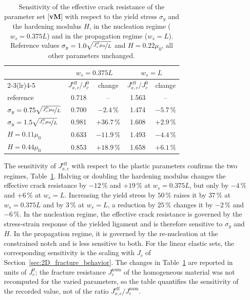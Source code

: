 \documentclass[pdflatex,sn-mathphys-num]{sn-jnl}%
\newcommand{\vMLabel}{[\textbf{vM}]\xspace}
\theoremstyle{thmstyleone}%
\theoremstyle{thmstyletwo}%
\theoremstyle{thmstylethree}%
\begin{document}
\begin{table}[htb]
\centering
\caption{Sensitivity of the effective crack resistance of the parameter set \vMLabel with respect to the yield stress $\sigma_y$ and the hardening modulus $H$, in the nucleation regime ($w_s = 0.375L$) and in the propagation regime ($w_s = L$). Reference values $\sigma_y = 1.0\sqrt{\nicefrac{J_c^0\mu_0}{L}}$ and $H = 0.22\mu_0$, all other parameters unchanged.}
\label{tab:sensitivity_2D}
\begin{tabular}{lcccc}
\toprule
 & \multicolumn{2}{c}{$w_s = 0.375L$} & \multicolumn{2}{c}{$w_s = L$} \\
\cmidrule(lr){2-3}\cmidrule(lr){4-5}
 & $J_{x,c}^{\text{eff}}/J_c^0$ & change & $J_{x,c}^{\text{eff}}/J_c^0$ & change \\
\midrule
reference                                        & 0.718 & --        & 1.563 & --       \\
$\sigma_y = 0.75\sqrt{\nicefrac{J_c^0\mu_0}{L}}$ & 0.700 & $-2.4\,\%$  & 1.474 & $-5.7\,\%$ \\
$\sigma_y = 1.5\sqrt{\nicefrac{J_c^0\mu_0}{L}}$  & 0.981 & $+36.7\,\%$ & 1.608 & $+2.9\,\%$ \\
$H = 0.11\mu_0$                                  & 0.633 & $-11.9\,\%$ & 1.493 & $-4.4\,\%$ \\
$H = 0.44\mu_0$                                  & 0.853 & $+18.9\,\%$ & 1.658 & $+6.1\,\%$ \\
\bottomrule
\end{tabular}
\end{table}

The sensitivity of $J_{x,c}^{\text{eff}}$ with respect to the plastic parameters confirms the two regimes, Table~\ref{tab:sensitivity_2D}. Halving or doubling the hardening modulus changes the effective crack resistance by $-12\,\%$ and $+19\,\%$ at $w_s = 0.375L$, but only by $-4\,\%$ and $+6\,\%$ at $w_s = L$. Increasing the yield stress by $50\,\%$ raises it by $37\,\%$ at $w_s = 0.375L$ and by $3\,\%$ at $w_s = L$, a reduction by $25\,\%$ changes it by $-2\,\%$ and $-6\,\%$. In the nucleation regime, the effective crack resistance is governed by the stress-strain response of the yielded ligament and is therefore sensitive to $\sigma_y$ and $H$. In the propagation regime, it is governed by the re-nucleation at the constrained notch and is less sensitive to both. For the linear elastic sets, the corresponding sensitivity is the scaling with $J_c$ of Section~\ref{sec:2D_fracture_behavior}. The changes in Table~\ref{tab:sensitivity_2D} are reported in units of $J_c^0$; the fracture resistance $J_c^{\text{num}}$ of the homogeneous material was not recomputed for the varied parameters, so the table quantifies the sensitivity of the recorded value, not of the ratio $J_{x,c}^{\text{eff}}/J_c^{\text{num}}$.
\end{document}
